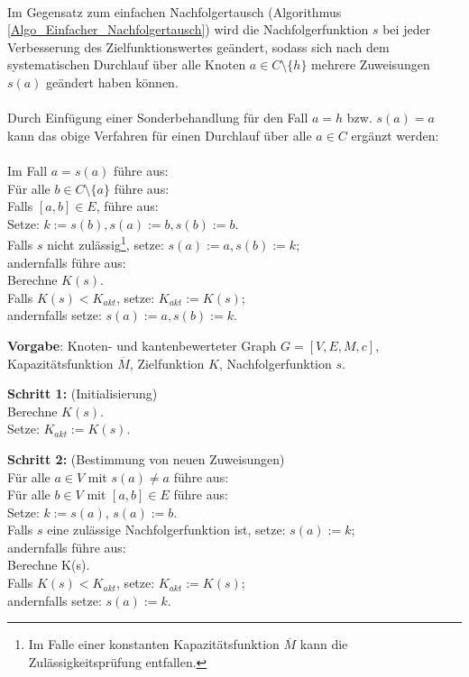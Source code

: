 \phantom \\
\noindent Im Gegensatz zum einfachen Nachfolgertausch (Algorithmus \ref{Algo_Einfacher_Nachfolgertausch}) wird die Nachfolgerfunktion $s$ bei jeder Verbesserung des Zielfunktionswertes geändert, sodass sich nach dem systematischen Durchlauf über alle Knoten $a \in C\setminus \{h\}$ mehrere Zuweisungen $s(a)$ geändert haben können.\\
\\
Durch Einfügung einer Sonderbehandlung für den Fall $a=h$ bzw. $s(a)=a$ kann das obige Verfahren für einen Durchlauf über alle $a \in C$ ergänzt werden:\\
\\
Im Fall $a=s(a)$ führe aus:\\
\phantom \quad Für alle $b \in C\setminus\{a\}$ führe aus:\\
\phantom \quad \qquad Falls $[a,b] \in E$, führe aus:\\
\phantom \quad \qquad \qquad Setze: $k := s(b), s(a) := b, s(b) := b$.\\
\phantom \quad \qquad \qquad Falls $s$ nicht zulässig\footnote{Im Falle einer konstanten Kapazitätsfunktion $\overline{M}$ kann die Zulässigkeitsprüfung entfallen.}, setze: $s(a) := a, s(b) := k$;\\
\phantom \quad \qquad \qquad andernfalls führe aus:\\
\phantom \quad \qquad \qquad \qquad Berechne $K(s)$.\\
\phantom \quad \qquad \qquad \qquad Falls $K(s) < K_{akt}$, setze: $K_{akt} := K(s)$;\\
\phantom \quad \qquad \qquad \qquad andernfalls setze: $s(a) := a, s(b) := k$.


\newpage
\begin{algo}
\label{Algo Verbesserung durch Einfügestrategie}
\textbf{Vorgabe}: Knoten- und kantenbewerteter Graph $G=[V,E,M,c]$, Kapazitätsfunktion $\overline{M}$, Zielfunktion $K$, Nachfolgerfunktion $s$.

\noindent 
\textbf{Schritt 1:} (Initialisierung)\\
\phantom \quad Berechne $K(s)$.\\
\phantom \quad Setze: $K_{akt} := K(s)$.

\noindent 
\textbf{Schritt 2:} (Bestimmung von neuen Zuweisungen)\\
\phantom \quad Für alle $a \in V$ mit $s(a) \neq a$ führe aus:\\
\phantom \quad \qquad Für alle $b \in V$ mit $[a,b] \in E$ führe aus:\\
\phantom \quad \qquad \qquad Setze: $k := s(a)$, $s(a):= b$.\\
\phantom \quad \qquad \qquad Falls $s$ eine zulässige Nachfolgerfunktion ist, setze: $s(a) := k$;\\
\phantom \quad \qquad \qquad andernfalls führe aus:\\
\phantom \quad \qquad \qquad \qquad Berechne K(s).\\
\phantom \quad \qquad \qquad \qquad Falls $K(s) < K_{akt}$, setze: $K_{akt} := K(s)$;\\
\phantom \quad \qquad \qquad \qquad andernfalls setze: $s(a) := k$.			
\end{algo}

